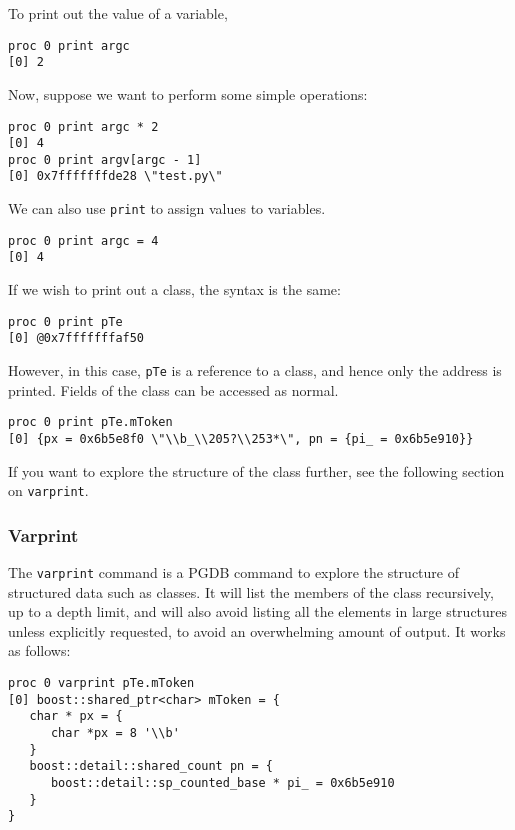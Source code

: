 \documentclass{refart}
\begin{document}
To print out the value of a variable,

\begin{Verbatim}
proc 0 print argc
[0] 2
\end{Verbatim}

Now, suppose we want to perform some simple operations:

\begin{Verbatim}
proc 0 print argc * 2
[0] 4
proc 0 print argv[argc - 1]
[0] 0x7fffffffde28 \"test.py\"
\end{Verbatim}

We can also use \texttt{print} to assign values to variables.

\begin{Verbatim}
proc 0 print argc = 4
[0] 4
\end{Verbatim}

If we wish to print out a class, the syntax is the same:

\begin{Verbatim}
proc 0 print pTe
[0] @0x7fffffffaf50
\end{Verbatim}

However, in this case, \texttt{pTe} is a reference to a class, and hence only the address is printed. Fields of the class can be accessed as normal.

\begin{Verbatim}
proc 0 print pTe.mToken
[0] {px = 0x6b5e8f0 \"\\b_\\205?\\253*\", pn = {pi_ = 0x6b5e910}}
\end{Verbatim}

If you want to explore the structure of the class further, see the following section on \texttt{varprint}.

\subsubsection{Varprint}

The \texttt{varprint} command is a PGDB command to explore the structure of structured data such as classes. It will list the members of the class recursively, up to a depth limit, and will also avoid listing all the elements in large structures unless explicitly requested, to avoid an overwhelming amount of output. It works as follows:

\begin{Verbatim}
proc 0 varprint pTe.mToken
[0] boost::shared_ptr<char> mToken = {
   char * px = {
      char *px = 8 '\\b'
   }
   boost::detail::shared_count pn = {
      boost::detail::sp_counted_base * pi_ = 0x6b5e910
   }
}
\end{Verbatim}
\end{document}
